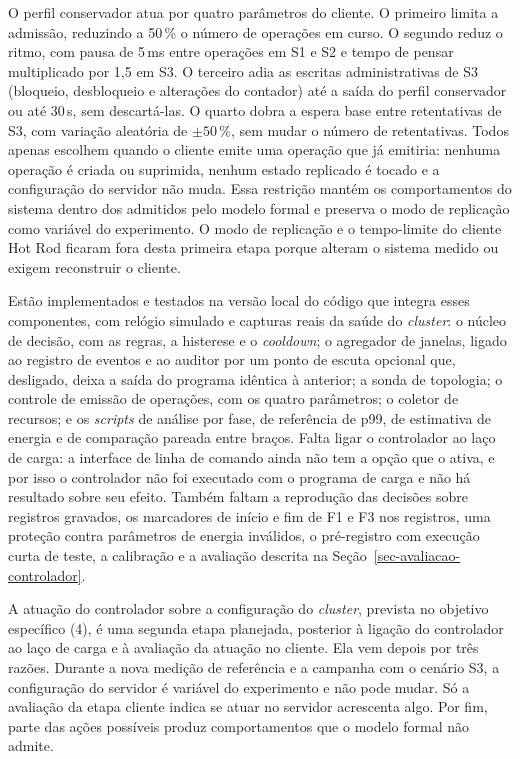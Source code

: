 O perfil conservador atua por quatro parâmetros do cliente. O primeiro limita a admissão, reduzindo a 50\,\% o número de operações em curso. O segundo reduz o ritmo, com pausa de 5\,ms entre operações em S1 e S2 e tempo de pensar multiplicado por 1,5 em S3. O terceiro adia as escritas administrativas de S3 (bloqueio, desbloqueio e alterações do contador) até a saída do perfil conservador ou até 30\,s, sem descartá-las. O quarto dobra a espera base entre retentativas de S3, com variação aleatória de $\pm 50\,\%$, sem mudar o número de retentativas. Todos apenas escolhem quando o cliente emite uma operação que já emitiria: nenhuma operação é criada ou suprimida, nenhum estado replicado é tocado e a configuração do servidor não muda. Essa restrição mantém os comportamentos do sistema dentro dos admitidos pelo modelo formal e preserva o modo de replicação como variável do experimento. O modo de replicação e o tempo-limite do cliente Hot Rod ficaram fora desta primeira etapa porque alteram o sistema medido ou exigem reconstruir o cliente.

Estão implementados e testados na versão local do código que integra esses componentes, com relógio simulado e capturas reais da saúde do \emph{cluster}: o núcleo de decisão, com as regras, a histerese e o \emph{cooldown}; o agregador de janelas, ligado ao registro de eventos e ao auditor por um ponto de escuta opcional que, desligado, deixa a saída do programa idêntica à anterior; a sonda de topologia; o controle de emissão de operações, com os quatro parâmetros; o coletor de recursos; e os \emph{scripts} de análise por fase, de referência de p99, de estimativa de energia e de comparação pareada entre braços. Falta ligar o controlador ao laço de carga: a interface de linha de comando ainda não tem a opção que o ativa, e por isso o controlador não foi executado com o programa de carga e não há resultado sobre seu efeito. Também faltam a reprodução das decisões sobre registros gravados, os marcadores de início e fim de F1 e F3 nos registros, uma proteção contra parâmetros de energia inválidos, o pré-registro com execução curta de teste, a calibração e a avaliação descrita na Seção~\ref{sec-avaliacao-controlador}.

\label{sec-controlador-cluster}
A atuação do controlador sobre a configuração do \emph{cluster}, prevista no objetivo específico (4), é uma segunda etapa planejada, posterior à ligação do controlador ao laço de carga e à avaliação da atuação no cliente. Ela vem depois por três razões. Durante a nova medição de referência e a campanha com o cenário S3, a configuração do servidor é variável do experimento e não pode mudar. Só a avaliação da etapa cliente indica se atuar no servidor acrescenta algo. Por fim, parte das ações possíveis produz comportamentos que o modelo formal não admite.

